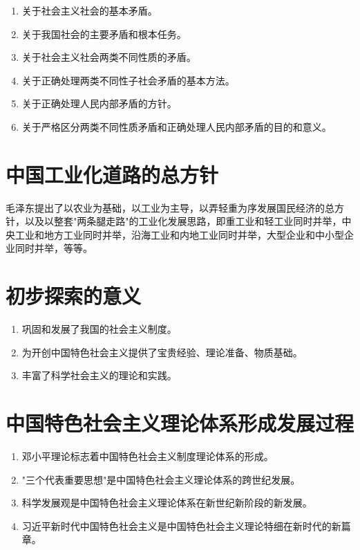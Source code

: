 \documentclass[12pt, a4paper, oneside]{ctexbook}
\begin{document}
\begin{enumerate}[label=（\arabic*）]
\item 关于社会主义社会的基本矛盾。

\item 关于我国社会的主要矛盾和根本任务。

\item 关于社会主义社会两类不同性质的矛盾。

\item 关于正确处理两类不同性子社会矛盾的基本方法。

\item 关于正确处理人民内部矛盾的方针。

\item 关于严格区分两类不同性质矛盾和正确处理人民内部矛盾的目的和意义。
\end{enumerate}

\section{中国工业化道路的总方针}

毛泽东提出了以农业为基础，以工业为主导，以弄轻重为序发展国民经济的总方针，以及以整套"两条腿走路"的工业化发展思路，即重工业和轻工业同时并举，中央工业和地方工业同时并举，沿海工业和内地工业同时并举，大型企业和中小型企业同时并举，等等。

\section{初步探索的意义}

\begin{enumerate}[label=（\arabic*）]
\item 巩固和发展了我国的社会主义制度。

\item 为开创中国特色社会主义提供了宝贵经验、理论准备、物质基础。

\item 丰富了科学社会主义的理论和实践。
\end{enumerate}

\section{中国特色社会主义理论体系形成发展过程}

\begin{enumerate}[label=（\arabic*）]
\item 邓小平理论标志着中国特色社会主义制度理论体系的形成。

\item "三个代表重要思想"是中国特色社会主义理论体系的跨世纪发展。

\item 科学发展观是中国特色社会主义理论体系在新世纪新阶段的新发展。

\item 习近平新时代中国特色社会主义是中国特色社会主义理论特细在新时代的新篇章。
\end{enumerate}
\end{document}
